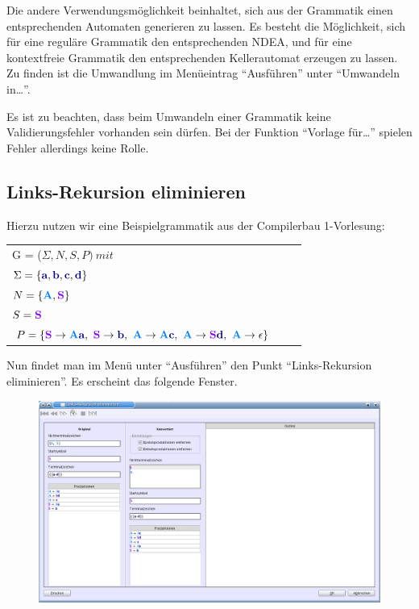 Die andere Verwendungsmöglichkeit beinhaltet, sich aus der Grammatik einen
ent\-sprechen\-den Automaten generieren zu lassen. Es besteht die Möglichkeit,
sich für eine reguläre Grammatik den entsprechenden NDEA, und für eine
kontextfreie Grammatik den entsprechenden Kellerautomat erzeugen zu
lassen. Zu finden ist die Umwandlung im Menüeintrag "`Ausführen"'
unter "`Umwandeln in\ldots"'.\vspace{10pt}

Es ist zu beachten, dass beim Umwandeln einer Grammatik keine
Validierungsfehler vorhanden sein dürfen. Bei der Funktion "`Vorlage
für\ldots"' spielen Fehler allerdings keine Rolle.

\subsection{Links-Rekursion eliminieren}

Hierzu nutzen wir eine Beispielgrammatik aus der Compilerbau 1-Vorlesung:

\begin{tabular}{lcr}
G = ($\Sigma, N, S, P )\ mit $\\
$\Sigma = \{\TerminalSymbol{a}, \TerminalSymbol{b}, \TerminalSymbol{c},
\TerminalSymbol{d}\}$\\ $N =
\{\NonterminalSymbol{A}, \StartSymbol{S}\}$\\ $S=\StartSymbol{S}$\\
$P = \{\StartSymbol{S} \to \NonterminalSymbol{A}\TerminalSymbol{a},\ \StartSymbol{S} \to \TerminalSymbol{b},\
\NonterminalSymbol{A}	\to \NonterminalSymbol{A}\TerminalSymbol{c},\ \NonterminalSymbol{A} \to \StartSymbol{S}\TerminalSymbol{d},\
\NonterminalSymbol{A} \to \epsilon\}$\\
\end{tabular}

Nun findet man im Menü unter "`Ausführen"' den Punkt "`Links-Rekursion eliminieren"'. Es erscheint das folgende Fenster.

\begin{figure}[h]
\begin{center}
\includegraphics[width=12cm]{../images/left_recursion.png}
\end{center}
\end{figure}


